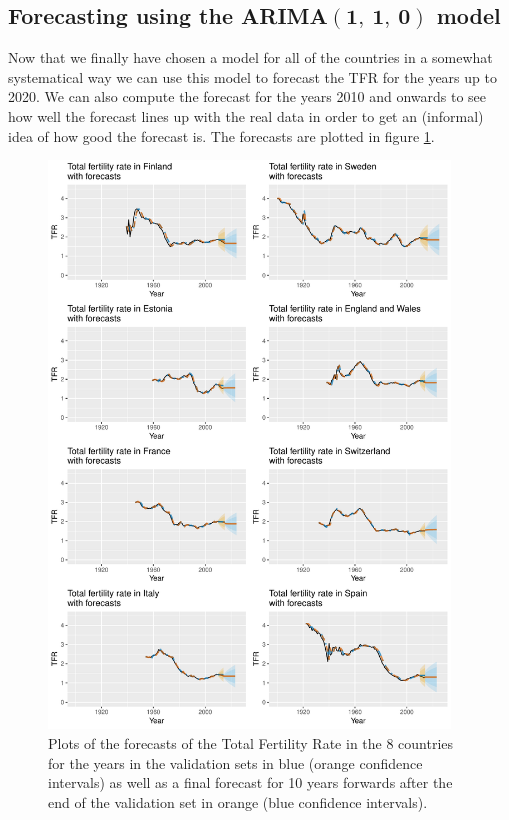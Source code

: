 \documentclass[a4paper, 12pt]{scrartcl}
\begin{document}
\subsection{Forecasting using the ARIMA$\boldsymbol{( 1 ,~ 1 ,~ 0 )}$ model}
Now that we finally have chosen a model for all of the countries in a somewhat systematical way we can use this model to forecast the TFR for the years up to 2020.
We can also compute the forecast for the years 2010 and onwards to see how well the forecast lines up with the real data in order to get an (informal) idea of how good the forecast is.
The forecasts are plotted in figure \ref{fig:110forecasts}.
\begin{figure}[p]

\centering
\includegraphics[width=0.95\textwidth]{arima110Forecasts.pdf}
\caption{Plots of the forecasts of the Total Fertility Rate in the 8 countries for the years in the validation sets in blue (orange confidence intervals) as well as a final forecast for 10 years forwards after the end of the validation set in orange (blue confidence intervals).\label{fig:110forecasts}}
\end{figure}
\end{document}
